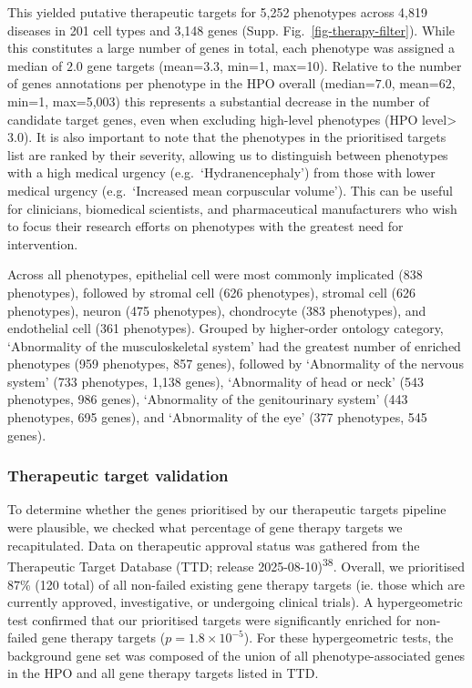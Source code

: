 \documentclass[
]{article}
\begin{document}
This yielded putative therapeutic targets for 5,252 phenotypes across
4,819 diseases in 201 cell types and 3,148 genes (Supp.
Fig.~\ref{fig-therapy-filter}). While this constitutes a large number of
genes in total, each phenotype was assigned a median of \(2.0\) gene
targets (mean=\(3.3\), min=1, max=10). Relative to the number of genes
annotations per phenotype in the HPO overall (median=\(7.0\),
mean=\(62\), min=1, max=5,003) this represents a substantial decrease in
the number of candidate target genes, even when excluding high-level
phenotypes (HPO level\textgreater{}\(3.0\)). It is also important to
note that the phenotypes in the prioritised targets list are ranked by
their severity, allowing us to distinguish between phenotypes with a
high medical urgency (e.g.~`Hydranencephaly') from those with lower
medical urgency (e.g.~`Increased mean corpuscular volume'). This can be
useful for clinicians, biomedical scientists, and pharmaceutical
manufacturers who wish to focus their research efforts on phenotypes
with the greatest need for intervention.

Across all phenotypes, epithelial cell were most commonly implicated
(838 phenotypes), followed by stromal cell (626 phenotypes), stromal
cell (626 phenotypes), neuron (475 phenotypes), chondrocyte (383
phenotypes), and endothelial cell (361 phenotypes). Grouped by
higher-order ontology category, `Abnormality of the musculoskeletal
system' had the greatest number of enriched phenotypes (959 phenotypes,
857 genes), followed by `Abnormality of the nervous system' (733
phenotypes, 1,138 genes), `Abnormality of head or neck' (543 phenotypes,
986 genes), `Abnormality of the genitourinary system' (443 phenotypes,
695 genes), and `Abnormality of the eye' (377 phenotypes, 545 genes).

\subsubsection{Therapeutic target
validation}\label{therapeutic-target-validation}

To determine whether the genes prioritised by our therapeutic targets
pipeline were plausible, we checked what percentage of gene therapy
targets we recapitulated. Data on therapeutic approval status was
gathered from the Therapeutic Target Database (TTD; release
2025-08-10)\textsuperscript{38}. Overall, we prioritised \(87\)\% (120
total) of all non-failed existing gene therapy targets (ie. those which
are currently approved, investigative, or undergoing clinical trials). A
hypergeometric test confirmed that our prioritised targets were
significantly enriched for non-failed gene therapy targets
(\(p=\)\(1.8 \times 10^{-5}\)). For these hypergeometric tests, the
background gene set was composed of the union of all
phenotype-associated genes in the HPO and all gene therapy targets
listed in TTD.
\end{document}
